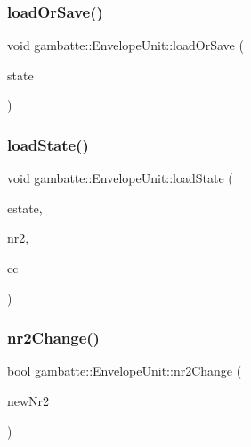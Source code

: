 \subsubsection{\texorpdfstring{load\+Or\+Save()}{loadOrSave()}}
{\footnotesize\ttfamily void gambatte\+::\+Envelope\+Unit\+::load\+Or\+Save (\begin{DoxyParamCaption}\item[{\hyperlink{classgambatte_1_1loadsave}{loadsave} \&}]{state }\end{DoxyParamCaption})}

\mbox{\label{classgambatte_1_1EnvelopeUnit_a3377c470989ee2ef9b60d9e2af1fca50}} 
\subsubsection{\texorpdfstring{load\+State()}{loadState()}}
{\footnotesize\ttfamily void gambatte\+::\+Envelope\+Unit\+::load\+State (\begin{DoxyParamCaption}\item[{\hyperlink{structgambatte_1_1SaveState_1_1SPU_1_1Env}{Save\+State\+::\+S\+P\+U\+::\+Env} const \&}]{estate,  }\item[{unsigned}]{nr2,  }\item[{unsigned}]{cc }\end{DoxyParamCaption})}

\mbox{\label{classgambatte_1_1EnvelopeUnit_ad7c7a2f2d1c323a39e15aac8f99a5101}} 
\subsubsection{\texorpdfstring{nr2\+Change()}{nr2Change()}}
{\footnotesize\ttfamily bool gambatte\+::\+Envelope\+Unit\+::nr2\+Change (\begin{DoxyParamCaption}\item[{unsigned}]{new\+Nr2 }\end{DoxyParamCaption})}

\mbox{\label{classgambatte_1_1EnvelopeUnit_abf4a0224ded8cc63701e587018d52581}} 
